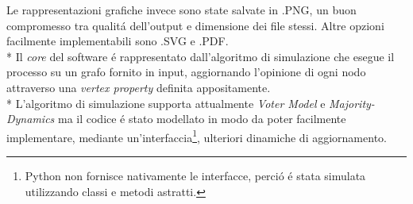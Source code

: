 \documentclass[../Tesi.tex]{subfiles}
\begin{document}
Le rappresentazioni grafiche invece sono state salvate in .PNG, un buon compromesso tra qualit\'a dell'output e dimensione dei file stessi. Altre opzioni facilmente implementabili sono .SVG e .PDF.\\*
Il \emph{core} del software \'e rappresentato dall'algoritmo di simulazione che esegue il processo su un grafo fornito in input, aggiornando l'opinione di ogni nodo attraverso una \emph{vertex property} definita appositamente.\\*
L'algoritmo di simulazione supporta attualmente \emph{Voter Model} e \emph{Majority-Dynamics} ma il codice \'e stato modellato in modo da poter facilmente implementare, mediante un'interfaccia\footnote{Python non fornisce nativamente le interfacce, perci\'o \'e stata simulata utilizzando classi e metodi astratti.}, ulteriori dinamiche di aggiornamento.
\end{document}
